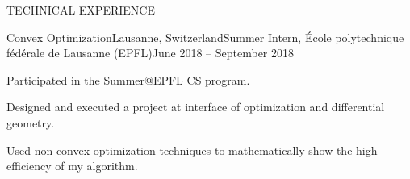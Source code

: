 \documentclass{resume} %
\begin{document}
\begin{rSection}{TECHNICAL EXPERIENCE}
\begin{rSubsection}{Convex Optimization}{Lausanne, Switzerland}{Summer Intern, \'Ecole polytechnique f\'ed\'erale de Lausanne (EPFL)}{June 2018 -- September 2018}
\item Participated in the Summer@EPFL CS program. 
\item Designed and executed a project at interface of optimization and differential geometry. 
\item Used non-convex optimization techniques to mathematically show the high efficiency of my algorithm.
\end{rSubsection}

\end{rSection}


\end{document}

